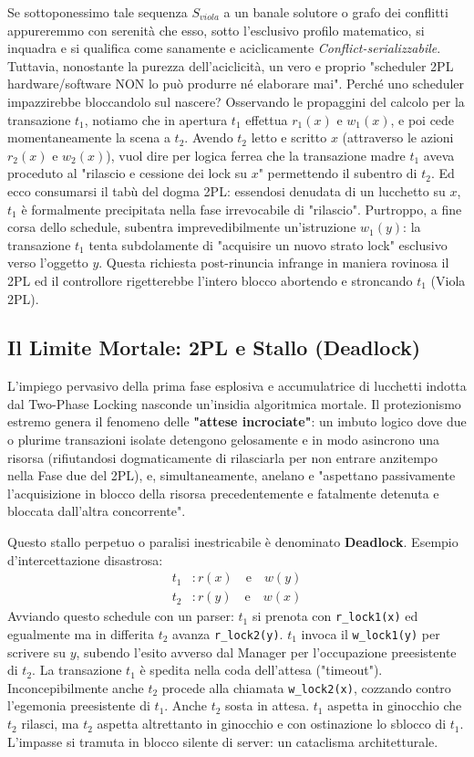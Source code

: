 Se sottoponessimo tale sequenza $S_{viola}$ a un banale solutore o grafo dei conflitti appureremmo con serenità che esso, sotto l'esclusivo profilo matematico, si inquadra e si qualifica come sanamente e aciclicamente \textit{Conflict-serializzabile}.
Tuttavia, nonostante la purezza dell'aciclicità, un vero e proprio "scheduler 2PL hardware/software NON lo può produrre né elaborare mai".
Perché uno scheduler impazzirebbe bloccandolo sul nascere? Osservando le propaggini del calcolo per la transazione $t_1$, notiamo che in apertura $t_1$ effettua $r_1(x)$ e $w_1(x)$, e poi cede momentaneamente la scena a $t_2$. Avendo $t_2$ letto e scritto $x$ (attraverso le azioni $r_2(x)$ e $w_2(x)$), vuol dire per logica ferrea che la transazione madre $t_1$ aveva proceduto al "rilascio e cessione dei lock su $x$" permettendo il subentro di $t_2$. Ed ecco consumarsi il tabù del dogma 2PL: essendosi denudata di un lucchetto su $x$, $t_1$ è formalmente precipitata nella fase irrevocabile di "rilascio". Purtroppo, a fine corsa dello schedule, subentra imprevedibilmente un'istruzione $w_1(y)$: la transazione $t_1$ tenta subdolamente di "acquisire un nuovo strato lock" esclusivo verso l'oggetto $y$. Questa richiesta post-rinuncia infrange in maniera rovinosa il 2PL ed il controllore rigetterebbe l'intero blocco abortendo e stroncando $t_1$ (Viola 2PL).

\subsection{Il Limite Mortale: 2PL e Stallo (Deadlock)}
L'impiego pervasivo della prima fase esplosiva e accumulatrice di lucchetti indotta dal Two-Phase Locking nasconde un'insidia algoritmica mortale. Il protezionismo estremo genera il fenomeno delle \textbf{"attese incrociate"}: un imbuto logico dove due o plurime transazioni isolate detengono gelosamente e in modo asincrono una risorsa (rifiutandosi dogmaticamente di rilasciarla per non entrare anzitempo nella Fase due del 2PL), e, simultaneamente, anelano e "aspettano passivamente l'acquisizione in blocco della risorsa precedentemente e fatalmente detenuta e bloccata dall'altra concorrente".

Questo stallo perpetuo o paralisi inestricabile è denominato \textbf{Deadlock}.
Esempio d'intercettazione disastrosa:
\begin{align*}
    t_1&: r(x) \quad \text{e} \quad w(y) \\
    t_2&: r(y) \quad \text{e} \quad w(x)
\end{align*}
Avviando questo schedule con un parser: $t_1$ si prenota con \texttt{r\_lock1(x)} ed egualmente ma in differita $t_2$ avanza \texttt{r\_lock2(y)}. $t_1$ invoca il \texttt{w\_lock1(y)} per scrivere su $y$, subendo l'esito avverso dal Manager per l'occupazione preesistente di $t_2$. La transazione $t_1$ è spedita nella coda dell'attesa ("timeout"). Inconcepibilmente anche $t_2$ procede alla chiamata \texttt{w\_lock2(x)}, cozzando contro l'egemonia preesistente di $t_1$. Anche $t_2$ sosta in attesa. $t_1$ aspetta in ginocchio che $t_2$ rilasci, ma $t_2$ aspetta altrettanto in ginocchio e con ostinazione lo sblocco di $t_1$. L'impasse si tramuta in blocco silente di server: un cataclisma architetturale.


